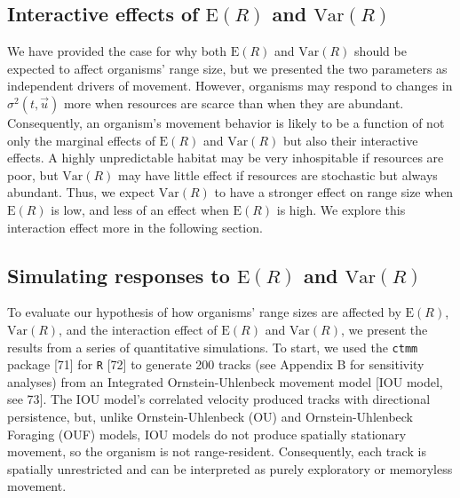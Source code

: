 \documentclass[
  12pt,
]{article}
\begin{document}
\subsection{\texorpdfstring{Interactive effects of \(\text{E}(R)\) and \(\text{Var}(R)\)}{Interactive effects of \textbackslash text\{E\}(R) and \textbackslash text\{Var\}(R)}}\label{interactive-effects-of-texter-and-textvarr}

\noindent We have provided the case for why both \(\text{E}(R)\) and \(\text{Var}(R)\) should be expected to affect organisms' range size, but we presented the two parameters as independent drivers of movement. However, organisms may respond to changes in \(\sigma^2(t, \vec u)\) more when resources are scarce than when they are abundant. Consequently, an organism's movement behavior is likely to be a function of not only the marginal effects of \(\text{E}(R)\) and \(\text{Var}(R)\) but also their interactive effects. A highly unpredictable habitat may be very inhospitable if resources are poor, but \(\text{Var}(R)\) may have little effect if resources are stochastic but always abundant. Thus, we expect \(\text{Var}(R)\) to have a stronger effect on range size when \(\text{E}(R)\) is low, and less of an effect when \(\text{E}(R)\) is high. We explore this interaction effect more in the following section.

\subsection{\texorpdfstring{Simulating responses to \(\text{E}(R)\) and \(\text{Var}(R)\)}{Simulating responses to \textbackslash text\{E\}(R) and \textbackslash text\{Var\}(R)}}\label{sims}

\noindent To evaluate our hypothesis of how organisms' range sizes are affected by \(\text{E}(R)\), \(\text{Var}(R)\), and the interaction effect of \(\text{E}(R)\) and \(\text{Var}(R)\), we present the results from a series of quantitative simulations. To start, we used the \texttt{ctmm} package {[}71{]} for \texttt{R} {[}72{]} to generate 200 tracks (see Appendix B for sensitivity analyses) from an Integrated Ornstein-Uhlenbeck movement model {[}IOU model, see 73{]}. The IOU model's correlated velocity produced tracks with directional persistence, but, unlike Ornstein-Uhlenbeck (OU) and Ornstein-Uhlenbeck Foraging (OUF) models, IOU models do not produce spatially stationary movement, so the organism is not range-resident. Consequently, each track is spatially unrestricted and can be interpreted as purely exploratory or memoryless movement.
\end{document}

